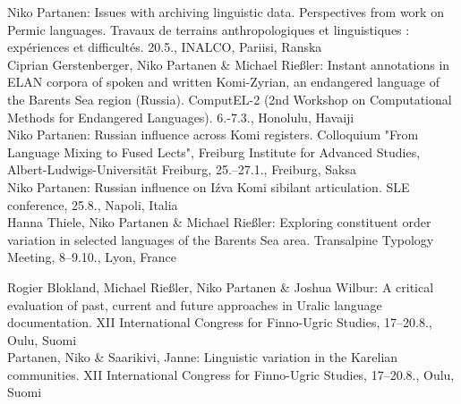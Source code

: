 \documentclass[11pt, a4paper]{article}
\newcommand{\years}[1]{\marginnote{\scriptsize #1}} %
\begin{document}
\years{2017}Niko Partanen: Issues with archiving linguistic data. Perspectives from work on Permic languages. Travaux de terrains anthropologiques et linguistiques : expériences et difficultés. 20.5., INALCO, Pariisi, Ranska\\

\years{2017}Ciprian Gerstenberger, Niko Partanen \& Michael Rießler: Instant annotations in ELAN corpora of spoken and written Komi-Zyrian, an endangered language of the Barents Sea region (Russia). ComputEL-2 (2nd Workshop on Computational Methods for Endangered Languages). 6.-7.3., Honolulu, Havaiji\\


\years{2017} Niko Partanen: Russian influence across Komi registers. Colloquium "From Language Mixing to Fused Lects", Freiburg Institute for Advanced Studies, Albert-Ludwigs-Universität Freiburg, 25.--27.1., Freiburg, Saksa\\


\years{2016} Niko Partanen: Russian influence on Iźva Komi sibilant articulation. SLE conference, 25.8., Napoli, Italia\\

\years{2015} Hanna Thiele, Niko Partanen \& Michael Rießler: Exploring constituent order variation in selected languages of the Barents Sea area. Transalpine Typology Meeting, 8–9.10., Lyon, France\\

\pagebreak

\years{2015} Rogier Blokland, Michael Rießler, Niko Partanen \& Joshua Wilbur: A critical evaluation of past, current and future approaches in Uralic language documentation. XII International Congress for Finno-Ugric Studies, 17–20.8., Oulu, Suomi\\


\years{2015} Partanen, Niko \& Saarikivi, Janne: Linguistic variation in the Karelian communities. XII International Congress for Finno-Ugric Studies, 17–20.8., Oulu, Suomi\\
\end{document}
